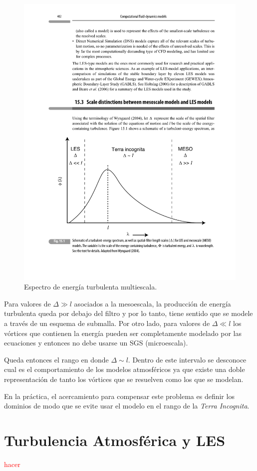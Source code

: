 \begin{figure}[H]
	\centering
	\includegraphics[width=0.8\linewidth,trim={2cm 3.0cm 1.5cm 11.5cm},clip]{Imagenes/terra}
	\caption{Espectro de energía turbulenta multiescala.}
	\label{fig:terra}
\end{figure}

Para valores de $\Delta\gg l$ asociados a la mesoescala, la producción de energía turbulenta queda por debajo del filtro y por lo tanto, tiene sentido que se modele a través de un esquema de submalla. Por otro lado, para valores de $\Delta\ll l$ los vórtices que contienen la energía pueden ser completamente modelado por las ecuaciones y entonces no debe usarse un SGS (microescala).

Queda entonces el rango en donde $\Delta\sim l$. Dentro de este intervalo se desconoce cual es el comportamiento de los modelos atmosféricos ya que existe una doble representación de tanto los vórtices que se resuelven como los que se modelan.

En la práctica, el acercamiento para compensar este problema es definir los dominios de modo que se evite usar el modelo en el rango de la \emph{Terra Incognita}.
\section{Turbulencia Atmosférica y LES}
\textcolor{red}{hacer}
